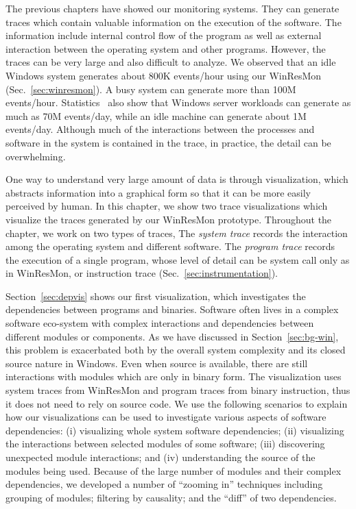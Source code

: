 
The previous chapters have showed our monitoring systems.
They can generate traces which contain valuable information on
the execution of the software.
The information include internal control flow of the program as well
as external interaction between the operating system and other programs.
However, the traces can be very large and also difficult to analyze.
We observed that an idle Windows system generates about 800K
events/hour using our WinResMon (Sec.~\ref{sec:winresmon}).
A busy system can generate more than 100M events/hour.
Statistics~\cite{verbowski6flight} also show that Windows
server workloads can generate as much as 70M events/day,
while an idle machine can generate about 1M events/day.
Although much of the interactions between the processes and software in the
system is contained in the trace, in practice, the detail
can be overwhelming.

One way to understand very large amount of data is through visualization,
which abstracts information into a graphical form so that it can be more
easily perceived by human.
In this chapter, we show two trace visualizations which visualize
the traces generated by our WinResMon prototype.
Throughout the chapter,
we work on two types of traces,
The {\em system trace} records the interaction among the operating system and
different software.
The {\em program trace} records the execution of a single program,
whose level of detail can be system call only as in WinResMon, or
instruction trace (Sec.~\ref{sec:instrumentation}).

Section~\ref{sec:depvis} shows our first visualization, which
investigates the dependencies between programs and binaries.
Software often lives in a complex software eco-system
with complex interactions and dependencies between different
modules or components.
As we have discussed in Section~\ref{sec:bg-win},
this problem is exacerbated both by the 
overall system complexity and its closed source nature in Windows.
Even when source is available, there are still interactions with
modules which are only in binary form.
The visualization uses system traces from WinResMon and
program traces from binary instruction,
thus it does not need to rely on source code.
We use the following scenarios to explain how our visualizations can
be used to investigate various aspects of software dependencies:
(i) visualizing whole system software dependencies;
(ii) visualizing the interactions between selected modules of some software;
(iii) discovering unexpected module interactions; 
and (iv) understanding the source of the modules being used.
Because of the large number of modules and their complex dependencies,
we developed a number of ``zooming in'' techniques including
grouping of modules;
filtering by causality; and
the ``diff'' of two dependencies.

